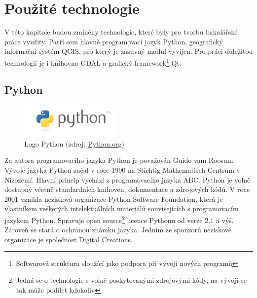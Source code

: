 \chapter{Použité technologie}
\label{3-technologie}
V této kapitole budou zmíněny technologie, které byly pro tvorbu
bakalářské práce využity. Patří sem hlavně programovací jazyk Python,
geografický informační systém QGIS, pro který je zásuvný modul vyvíjen.
Pro práci důležitou technologií je i knihovna GDAL a grafický
framework\footnote{Softwarová struktura sloužící jako podpora při
  vývoji nových programů} Qt.

\section{Python}
\label{sec:python}
\begin{figure}[H]
	 \centering
      \includegraphics[width=5cm]{./pictures/python-logo.png}
      \caption{Logo Python (zdroj:
\href{https://www.python.org/static/community_logos/python-logo-master-v3-TM.png}{Python.org})}
      \label{fig:python}
  \end{figure}

Za autora programovacího jazyka Python je považován Guido vam Roosum.
Vývoje jazyka Python začal v roce 1990 na Stichtig Mathematisch
Centrum v Nizozemí. Hlavní princip
vychází z programovacího jazyka ABC. Python je volně dostupný včetně
standardních knihoven, dokumentace a zdrojových kódů. V roce 2001
vznikla nezisková organizace Python Software Foundation, která je
vlastníkem veškerých intelektuálních materiálů souvisejících s
programovacím jazykem
Python. Spravuje open source\footnote{Jedná se o technologie s volně
  poskytovanými zdrojovými kódy, na vývoji se tak může podílet
  kdokoliv} licence Pythonu od verze 2.1 a výš. Zároveň se stará o
ochranou známku jazyka. Jedním ze sponzorů neziskové organizace je
společnost Digital Creations. \cite{ucebnicepython}

